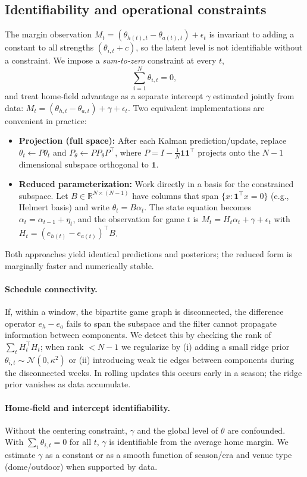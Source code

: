 \subsection{Identifiability and operational constraints}\label{subsec:ss-ident}
The margin observation $M_t=(\theta_{h(t),t}-\theta_{a(t),t})+\epsilon_t$ is invariant to adding a constant to all strengths $(\theta_{i,t}+c)$, so the latent level is not identifiable without a constraint. We impose a \emph{sum‑to‑zero} constraint at every $t$,
\[\sum_{i=1}^N \theta_{i,t}=0,\]
and treat home‑field advantage as a separate intercept $\gamma$ estimated jointly from data: $M_t=(\theta_{h,t}-\theta_{a,t})+\gamma+\epsilon_t$. Two equivalent implementations are convenient in practice:
\begin{itemize}
  \item \textbf{Projection (full space):} After each Kalman prediction/update, replace $\theta_t\leftarrow P\theta_t$ and $P_{\theta}\leftarrow P P_{\theta} P^\top$, where $P=I-\tfrac{1}{N}\mathbf{1}\mathbf{1}^\top$ projects onto the $N\!-\!1$ dimensional subspace orthogonal to $\mathbf 1$.
  \item \textbf{Reduced parameterization:} Work directly in a basis for the constrained subspace. Let $B\in\mathbb{R}^{N\times (N-1)}$ have columns that span $\{x: \mathbf{1}^\top x=0\}$ (e.g., Helmert basis) and write $\theta_t=B\alpha_t$. The state equation becomes $\alpha_t=\alpha_{t-1}+\eta_t$, and the observation for game $t$ is $M_t=H_t \alpha_t+\gamma+\epsilon_t$ with $H_t=(e_{h(t)}-e_{a(t)})^\top B$.
\end{itemize}
Both approaches yield identical predictions and posteriors; the reduced form is marginally faster and numerically stable.

\paragraph{Schedule connectivity.} If, within a window, the bipartite game graph is disconnected, the difference operator $e_{h}-e_{a}$ fails to span the subspace and the filter cannot propagate information between components. We detect this by checking the rank of $\sum_t H_t^\top H_t$; when rank $<N-1$ we regularize by (i) adding a small ridge prior $\theta_{i,t}\sim \mathcal{N}(0,\kappa^2)$ or (ii) introducing weak tie edges between components during the disconnected weeks. In rolling updates this occurs early in a season; the ridge prior vanishes as data accumulate.

\paragraph{Home‑field and intercept identifiability.} Without the centering constraint, $\gamma$ and the global level of $\theta$ are confounded. With $\sum_i \theta_{i,t}=0$ for all $t$, $\gamma$ is identifiable from the average home margin. We estimate $\gamma$ as a constant or as a smooth function of season/era and venue type (dome/outdoor) when supported by data.

